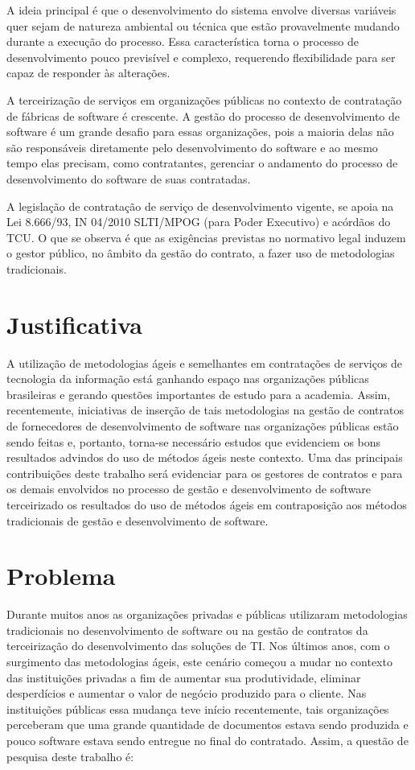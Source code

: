 A ideia principal é que o desenvolvimento do sistema envolve diversas variáveis quer sejam de natureza ambiental ou técnica que estão provavelmente mudando durante a execução do processo. Essa característica torna o processo de desenvolvimento pouco previsível e complexo, requerendo flexibilidade para ser capaz de responder às alterações.

A terceirização de serviços em organizações públicas no contexto de contratação de fábricas de software é crescente. A gestão do processo de desenvolvimento de software é um grande desafio para essas organizações, pois a maioria delas não são responsáveis diretamente pelo desenvolvimento do software e ao mesmo tempo elas precisam, como contratantes, gerenciar o andamento do processo de desenvolvimento do software de suas contratadas. 

A legislação de contratação de serviço de desenvolvimento vigente, se apoia na Lei 8.666/93, IN 04/2010 SLTI/MPOG (para Poder Executivo) e acórdãos do TCU. O que se observa é que as exigências previstas no normativo legal induzem o gestor público, no âmbito da gestão do contrato, a fazer uso de metodologias tradicionais.


\section[Justificativa]{Justificativa}

A utilização de metodologias ágeis e semelhantes em contratações de serviços de tecnologia da informação está ganhando espaço nas organizações públicas brasileiras e gerando questões importantes de estudo para a academia. Assim, recentemente, iniciativas de inserção de tais metodologias na gestão de contratos de fornecedores de desenvolvimento de software nas organizações públicas estão sendo feitas e, portanto, torna-se necessário estudos que evidenciem os bons resultados advindos do uso de métodos ágeis neste contexto. Uma das principais contribuições deste trabalho será evidenciar para os gestores de contratos e para os demais envolvidos no processo de gestão e desenvolvimento de software terceirizado os resultados do uso de métodos ágeis em contraposição aos métodos tradicionais de gestão e desenvolvimento de software. 

\section[Problema]{Problema}

Durante muitos anos as organizações privadas e públicas utilizaram metodologias tradicionais no desenvolvimento de software ou na gestão de contratos da terceirização do desenvolvimento das soluções de TI. Nos últimos anos, com o surgimento das metodologias ágeis, este cenário começou a mudar no contexto das instituições privadas a fim de aumentar sua produtividade, eliminar desperdícios e aumentar o valor de negócio produzido para o cliente. Nas instituições públicas essa mudança teve início recentemente, tais organizações perceberam que uma grande quantidade de documentos estava sendo produzida e pouco software estava sendo entregue no final do contratado. Assim, a questão de pesquisa deste trabalho é:

